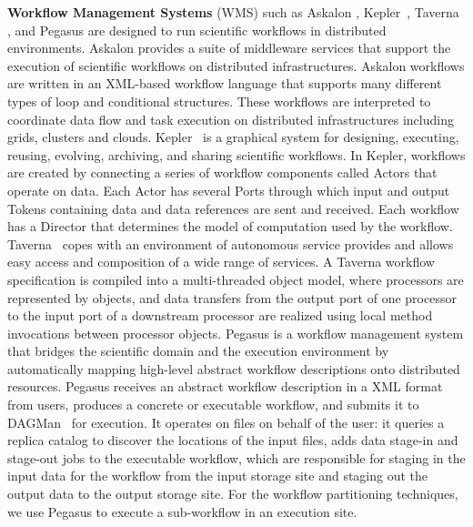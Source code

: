 \textbf{Workflow Management Systems} (WMS) such as Askalon \cite{Wieczorek2005}, Kepler~\cite{kepler}, Taverna \cite{Oinn2004}, and Pegasus \cite{Deelman2004} are designed to run scientific workflows in distributed environments. 
Askalon \cite{Fahringer2005} provides a suite of middleware services that support the execution of scientific workflows on distributed infrastructures. Askalon workflows are written in an XML-based workflow language that supports many different types of loop and conditional structures. These workflows are interpreted to coordinate data flow and task execution on distributed infrastructures including grids, clusters and clouds.
Kepler~\cite{kepler} is a graphical system for designing, executing, reusing, evolving, archiving, and sharing scientific workflows. In Kepler, workflows are created by connecting a series of workflow components called Actors that operate on data. Each Actor has several Ports through which input and output Tokens containing data and data references are sent and received. Each workflow has a Director that determines the model of computation used by the workflow.
Taverna~\cite{Oinn2004} copes with an environment of autonomous service provides and allows easy access and composition of a wide range of services. A Taverna workflow specification is compiled into a multi-threaded object model, where processors are represented by objects, and data transfers from the output port of one processor to the input port of a downstream processor are realized using local method invocations between processor objects. 
Pegasus \cite{Deelman2004} is a workflow management system that bridges the scientific domain and the execution environment by automatically mapping high-level abstract workflow descriptions onto distributed resources. Pegasus receives an abstract workflow description in a XML format from users, produces a concrete or executable workflow, and submits it to DAGMan~\cite{DAGMan} for execution. It operates on files on behalf of the user: it queries a replica catalog to discover the locations of the input files, adds data stage-in and stage-out jobs to the executable workflow, which are responsible for staging in the input data for the workflow from the input storage site and staging out the output data to the output storage site. 
For the workflow partitioning techniques, we use Pegasus to execute a sub-workflow in an execution site. 

